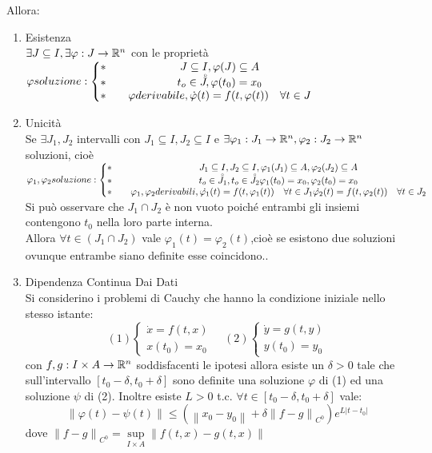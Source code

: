 Allora:
\begin{enumerate}
	\item Esistenza\\
	$\exists J\subseteq I, \exists\varphi : J \to \mathbb{R}^n$ con le proprietà\\
	$\varphi soluzione:
	\left\{
	\begin{matrix}
	\ast && J\subseteq I, \varphi(J)\subseteq{A}\\
	\ast && t_o\in\accentset{\circ}{J}, \varphi(t_0)=x_0\\
	\ast && \varphi derivabile, \dot{\varphi}(t)=f(t,\varphi(t)) \quad\forall t\in J\end{matrix}\right.$
	\item Unicità\\
	Se $\exists J_1,J_2$ intervalli con $J_1\subseteq I,J_2\subseteq I$ e $\exists \varphi_1:J_1\to \mathbb{R}^n, \varphi_2:J_2\to \mathbb{R}^n$ soluzioni, cioè\\
	$\varphi_1,\varphi_2 soluzione:
	\left\{
	\begin{matrix}
	\ast && J_1\subseteq I,J_2\subseteq I, \varphi_1(J_1)\subseteq{A},\varphi_2(J_2)\subseteq{A}\\
	\ast && t_o\in\accentset{\circ}{J_1},t_o\in\accentset{\circ}{J_2} \varphi_1(t_0)=x_0, \varphi_2(t_0)=x_0\\
	\ast && \varphi_1,\varphi_2 derivabili, \dot{\varphi_1}(t)=f(t,\varphi_1(t)) \quad\forall t\in J_1
	\dot{\varphi_2}(t)=f(t,\varphi_2(t)) \quad\forall t\in J_2
	\end{matrix}\right.$
	Si può osservare che $J_1\cap J_2$ è non vuoto poiché entrambi gli insiemi contengono $t_0$ nella loro parte interna.\\
	Allora $\forall t \in(J_1\cap J_2)$ vale $\varphi_1(t)=\varphi_2(t)$,cioè se esistono due soluzioni ovunque entrambe siano definite esse coincidono..\\
	\item Dipendenza Continua Dai Dati\\
	Si considerino i problemi di Cauchy che hanno la condizione iniziale nello stesso istante:
	$$ 
	(1)\left\{
	\begin{matrix}
	\dot{x}=f(t,x)\\x(t_0)=x_0
	\end{matrix}
	\right.\quad
	(2)\left\{
	\begin{matrix}
	\dot{y}=g(t,y)\\y(t_0)=y_0
	\end{matrix}
	\right.
	$$
	con $f,g:I\times A \to \mathbb{R}^n$ soddisfacenti le ipotesi allora esiste un $\delta >0$ tale che sull'intervallo $\left[ t_0-\delta,t_0+\delta \right]$ sono definite una soluzione $\varphi$ di (1) ed una soluzione $\psi$ di (2). Inoltre esiste $L>0$ t.c. $\forall t\in \left[t_0-\delta,t_0+\delta\right]$ vale:
	$$ 
	\left\| \varphi(t)-\psi(t) \right\| 
	\le 
	(\left\| x_0-y_0 \right\|+\delta\left\| f-g \right\|_{C^0})e^{L|t-t_0|}  
	$$
	dove $\left\| f-g \right\|_{C^0}=\sup\limits_{I\times A}\left\|f(t,x)-g(t,x)\right\|$
\end{enumerate}
